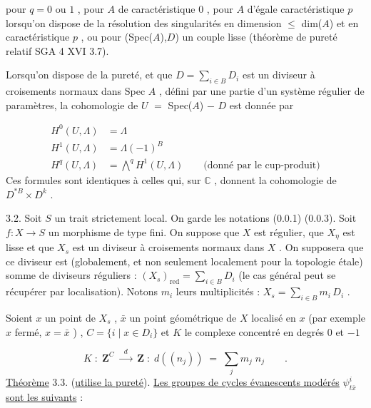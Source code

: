 pour  $q = 0$ ou $1$ , pour  $A$  de caractéristique  $0$ , pour  $A$  d'égale caractéristique  $p$  lorsqu'on dispose de la résolution des singularités en dimension $\leqslant$ dim($A$)  et en caractéristique  $p$ , ou pour  (Spec($A$),$D$)  un couple lisse (théorème de pureté relatif  SGA 4 XVI 3.7).

Lorsqu'on dispose de la pureté, et que  $D = \sum\limits_{i \in B} D_{i}$  est un diviseur à croisements normaux dans  Spec $A$ , défini par une partie d'un système régulier de paramètres, la cohomologie de  $U$ $=$ Spec($A$) $-$ $D$  est donnée par



\begin{equation}\tag{3.1.2}
\begin{aligned} H^{0}(U,\Lambda) &= \Lambda \\[4pt] H^{1}(U,\Lambda) &= \Lambda(-1)^{B} \\[4pt] H^{q}(U,\Lambda) &= \overset{q}{\bigwedge} H^{1}(U,\Lambda) \qquad \text{(donné par le cup-produit)} \end{aligned}
\end{equation}
Ces formules sont identiques à celles qui, sur  $\mathbb{C}$ , donnent la cohomologie de $D^{*B} \times D^{k}$ .

3.2. Soit  $S$  un trait strictement local. On garde les notations (0.0.1) (0.0.3). Soit  $f : X \longrightarrow S$  un morphisme de type fini. On suppose que  $X$  est régulier, que  $X_{\eta}$  est lisse et que  $X_{s}$  est un diviseur à croisements normaux dans  $X$ . On supposera que ce diviseur est (globalement, et non seulement localement pour la topologie étale) somme de diviseurs réguliers : $(X_{s})_{\mathrm{red}} = \sum\limits_{i \in B} D_{i}$  (le cas général peut se récupérer par localisation). Notons  $m_{i}$  leurs multiplicités : $X_{s} = \sum\limits_{i \in B} m_{i}\, D_{i}$ .

Soient  $x$  un point de  $X_{s}$ , $\bar{x}$  un point géométrique de  $X$  localisé en  $x$  (par exemple  $x$  fermé,  $x = \bar{x}$ ) ,  $C = \{i \mid x \in D_{i}\}$  et  $K$  le complexe concentré en degrés  $0$  et  $-1$

\begin{equation*}
K \;:\; \mathbf{Z}^{C} \;\xrightarrow{\;\;d\;\;}\; \mathbf{Z} \;:\; d((n_{j})) \;=\; \sum\limits_{j} m_{j}\; n_{j} \qquad .
\end{equation*}
\underline{Théorème} 3.3. (\underline{utilise la pureté}). \underline{Les groupes de cycles évanescents modérés} $\psi^{i}_{t\bar{x}}$ \underline{sont les suivants} :


